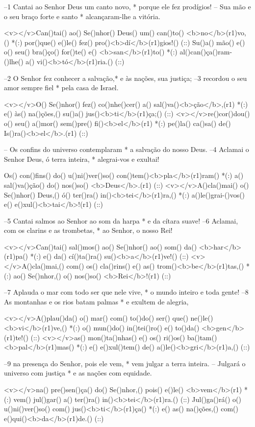 –1 Cantai ao Senhor Deus um canto novo, * 
porque ele fez prodígios! 
– Sua mão e o seu braço forte e santo * 
alcançaram-lhe a vitória.

<v></v>Can()tai() ao() Se()nhor() Deus() um() can()to() <b>no</b>(r1)vo,() *(:)
por()que() e()le() fez() pro()<b>dí</b>(r1)gios!() (::)
Su()a() mão() e() o() seu() bra()ço() for()te() e() <b>san</b>(r1)to() *(:)
al()can()ça()ram-()lhe() a() vi()<b>tó</b>(r1)ria.() (::)

–2 O Senhor fez conhecer a salvação,*
e às nações, sua justiça; 
–3 recordou o seu amor sempre fiel * 
pela casa de Israel.

<v></v>O() Se()nhor() fez() co()nhe()cer() a() sal()va()<b>ção</b>,(r1) *(:)
e() às() na()ções,() su()a() jus()<b>ti</b>(r1)ça;() (::)
<v></v>re()cor()dou() o() seu() a()mor() sem()pre() fi()<b>el</b>(r1) *(:)
pe()la() ca()sa() de() Is()ra()<b>el</b>.(r1) (::)

– Os confins do universo contemplaram * 
a salvação do nosso Deus. 
–4 Aclamai o Senhor Deus, ó terra inteira, * 
alegrai-vos e exultai!

Os() con()fins() do() u()ni()ver()so() con()tem()<b>pla</b>(r1)ram() *(:)
a() sal()va()ção() do() nos()so() <b>Deus</b>.(r1) (::)
<v></v>A()cla()mai() o() Se()nhor() Deus,() ó() ter()ra() in()<b>tei</b>(r1)ra,() *(:)
a()le()grai-()vos() e() e()xul()<b>tai</b>!(r1) (::)

–5 Cantai salmos ao Senhor ao som da harpa * 
e da cítara suave! 
–6 Aclamai, com os clarins e as trombetas, * 
ao Senhor, o nosso Rei!

<v></v>Can()tai() sal()mos() ao() Se()nhor() ao() som() da() <b>har</b>(r1)pa() *(:)
e() da() cí()ta()ra() su()<b>a</b>(r1)ve!() (::)
<v></v>A()cla()mai,() com() os() cla()rins() e() as() trom()<b>be</b>(r1)tas,() *(:)
ao() Se()nhor,() o() nos()so() <b>Rei</b>!(r1) (::)

–7 Aplauda o mar com todo ser que nele vive, * 
o mundo inteiro e toda gente! 
–8 As montanhas e os rios batam palmas *
e exultem de alegria,

<v></v>A()plau()da() o() mar() com() to()do() ser() que() ne()le() <b>vi</b>(r1)ve,() *(:)
o() mun()do() in()tei()ro() e() to()da() <b>gen</b>(r1)te!() (::)
<v></v>as() mon()ta()nhas() e() os() ri()os() ba()tam() <b>pal</b>(r1)mas() *(:)
e() e()xul()tem() de() a()le()<b>gri</b>(r1)a,() (::)

–9 na presença do Senhor, pois ele vem, * 
vem julgar a terra inteira. 
– Julgará o universo com justiça * 
e as nações com equidade.

<v></v>na() pre()sen()ça() do() Se()nhor,() pois() e()le() <b>vem</b>(r1) *(:)
vem() jul()gar() a() ter()ra() in()<b>tei</b>(r1)ra.() (::)
Jul()ga()rá() o() u()ni()ver()so() com() jus()<b>ti</b>(r1)ça() *(:)
e() as() na()ções,() com() e()qui()<b>da</b>(r1)de.() (::)